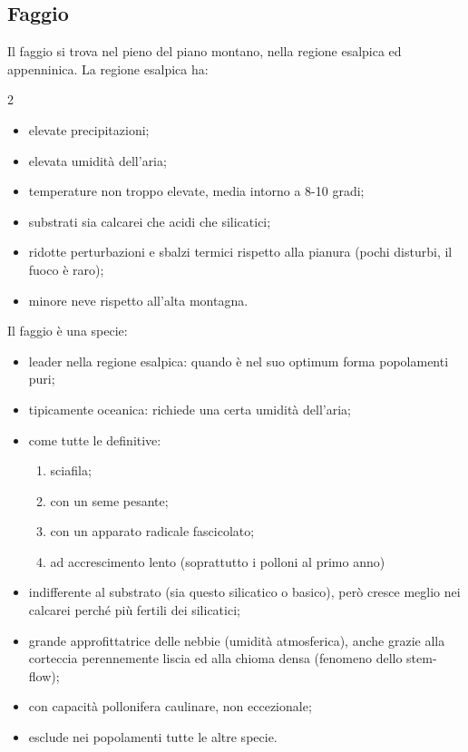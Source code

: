 \subsection{Faggio}
Il faggio si trova nel pieno del piano montano, nella regione esalpica ed appenninica. La regione esalpica ha:
\begin{multicols}{2}
\begin{itemize}[nosep]
    \item elevate precipitazioni;
    \item elevata umidità dell'aria; 
    \item temperature non troppo elevate, media intorno a 8-10 gradi;
    \item substrati sia calcarei che acidi che silicatici;
    \item ridotte perturbazioni e sbalzi termici rispetto alla pianura (pochi disturbi, il fuoco è raro);
    \item minore neve rispetto all'alta montagna.
\end{itemize}
\end{multicols}
Il faggio è una specie:
\begin{itemize}[nosep]
    \item leader nella regione esalpica: quando è nel suo optimum forma popolamenti puri;
    \item tipicamente oceanica: richiede una certa umidità dell'aria;
    \item come tutte le definitive:
    \begin{enumerate}[nosep]
        \item sciafila;
        \item con un seme pesante;
        \item con un apparato radicale fascicolato;
        \item ad accrescimento lento (soprattutto i polloni al primo anno)
    \end{enumerate}
    \item indifferente al substrato (sia questo silicatico o basico), però cresce meglio nei calcarei perché più fertili dei silicatici;
    \item grande approfittatrice delle nebbie (umidità atmosferica), anche grazie alla corteccia perennemente liscia ed alla chioma densa (fenomeno dello stem-flow);
    \item con capacità pollonifera caulinare, non eccezionale;
    \item esclude nei popolamenti tutte le altre specie.
\end{itemize}

